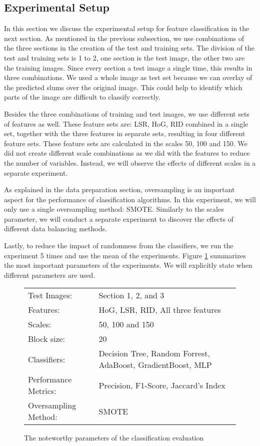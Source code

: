 \subsection{Experimental Setup}

In this section we discuss the experimental setup for feature classification in the next section. As mentioned in the previous subsection, we use combinations of the three sections in the creation of the test and training sets. The division of the test and training sets is 1 to 2, one section is the test image, the other two are the training images. Since every section a test image a single time, this results in three combinations.  We used a whole image as test set because we can overlay of the predicted slums over the original image. This could help to identify which parts of the image are difficult to classify correctly.

Besides the three combinations of training and test images, we use different sets of features as well. These feature sets are: LSR, HoG, RID combined in a single set, together with the three features in separate sets, resulting in four different feature sets. These feature sets are calculated in the scales 50, 100 and 150. We did not create different scale combinations as we did with the features to reduce the number of variables. Instead, we will observe the effects of different scales in a separate experiment.

As explained in the data preparation section, oversampling is an important aspect for the performance of classification algorithms. In this experiment, we will only use a single oversampling method: SMOTE. Similarly to the scales parameter, we will conduct a separate experiment to discover the effects of different data balancing methods.

Lastly, to reduce the impact of randomness from the classifiers, we run the experiment 5 times and use the mean of the experiments. Figure \ref{fig:params} summarizes the most important parameters of the experiments. We will explicitly state when different parameters are used.

\begin{figure}
	\centering
	\begin{tabular}{|ll|}
		\hline
		Test Images: & Section 1, 2, and 3 \\
		Features: & HoG, LSR, RID, All three features\\
		Scales: & 50, 100 and 150 \\
		Block size: & 20\\
		Classifiers: & Decision Tree, Random Forrest, AdaBoost, GradientBoost, MLP \\
		Performance Metrics: & Precision, F1-Score, Jaccard's Index\\
		Oversampling Method: & SMOTE\\
		\hline
	\end{tabular}
	\caption{The noteworthy parameters of the classification evaluation}
	\label{fig:params}
\end{figure}

